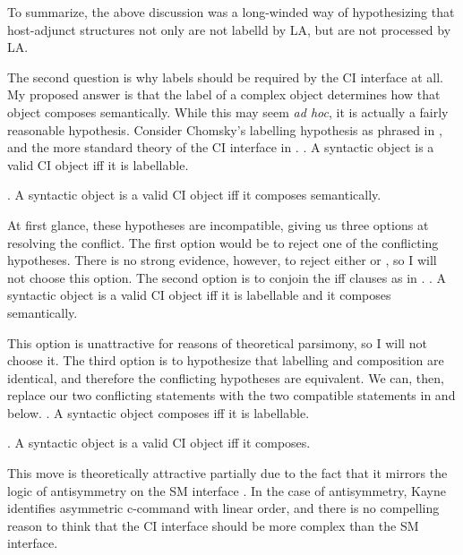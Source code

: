 \documentclass[MilwayThesis]{subfiles}
\begin{document}
To summarize, the above discussion was a long-winded way of hypothesizing that host-adjunct structures not only are not labelld by LA, but are not processed by LA.


The second question is why labels should be required by the CI interface at all.
My proposed answer is that the label of a complex object determines how that object composes semantically.
While this may seem \textit{ad hoc}, it is actually a fairly reasonable hypothesis.
Consider Chomsky's labelling hypothesis as phrased in \Next, and the more standard theory of the CI interface in \NNext.
\ex. A syntactic object is a valid CI object iff it is labellable.

\ex. A syntactic object is a valid CI object iff it composes semantically.

At first glance, these hypotheses are incompatible, giving us three options at resolving the conflict.
The first option would be to reject one of the conflicting hypotheses.
There is no strong evidence, however, to reject either \LLast or \Last, so I will not choose this option.
The second option is to conjoin the iff clauses as in \Next.
\ex. A syntactic object is a valid CI object iff it is labellable and it composes semantically.

This option is unattractive for reasons of theoretical parsimony, so I will not choose it.
The third option is to hypothesize that labelling and composition are identical, and therefore the conflicting hypotheses are equivalent.
We can, then, replace our two conflicting statements with the two compatible statements in \Next and \NNext below.
\ex. A syntactic object composes iff it is labellable.

\ex. A syntactic object is a valid CI object iff it composes.

This move is theoretically attractive partially due to the fact that it mirrors the logic of antisymmetry on the SM interface \parencite{kayne1994antisymmetry}.
In the case of antisymmetry, Kayne identifies asymmetric c-command with linear order, and there is no compelling reason to think that the CI interface should be more complex than the SM interface.
\end{document}
